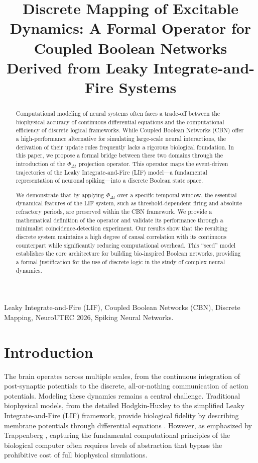 \documentclass[10pt, conference]{IEEEtran}
\title{\textbf{Discrete Mapping of Excitable Dynamics: A Formal Operator for Coupled Boolean Networks Derived from Leaky Integrate-and-Fire Systems}}
\author{
    \IEEEauthorblockN{Carlos R. P. Tovar, PhD}
    \IEEEauthorblockA{\textit{V Congreso Internacional de Neurociencias (NeuroUTEC 2026)} \\
    \textit{Universidad Tecnológica del Perú (UTP)}\\
    Lima, Perú \\
    Email: c31644@utp.edu.pe}
}
\begin{document}
\maketitle

\begin{abstract}
Computational modeling of neural systems often faces a trade-off between the biophysical accuracy of continuous differential equations and the computational efficiency of discrete logical frameworks. While Coupled Boolean Networks (CBN) offer a high-performance alternative for simulating large-scale neural interactions, the derivation of their update rules frequently lacks a rigorous biological foundation. In this paper, we propose a formal bridge between these two domains through the introduction of the $\Phi_{\Delta t}$ projection operator. This operator maps the event-driven trajectories of the Leaky Integrate-and-Fire (LIF) model—a fundamental representation of neuronal spiking—into a discrete Boolean state space. 

We demonstrate that by applying $\Phi_{\Delta t}$ over a specific temporal window, the essential dynamical features of the LIF system, such as threshold-dependent firing and absolute refractory periods, are preserved within the CBN framework. We provide a mathematical definition of the operator and validate its performance through a minimalist coincidence-detection experiment. Our results show that the resulting discrete system maintains a high degree of causal correlation with its continuous counterpart while significantly reducing computational overhead. This ``seed'' model establishes the core architecture for building bio-inspired Boolean networks, providing a formal justification for the use of discrete logic in the study of complex neural dynamics.
\end{abstract}

\begin{IEEEkeywords}
Leaky Integrate-and-Fire (LIF), Coupled Boolean Networks (CBN), Discrete Mapping, NeuroUTEC 2026, Spiking Neural Networks.
\end{IEEEkeywords}


\section{Introduction}

The brain operates across multiple scales, from the continuous integration of post-synaptic potentials to the discrete, all-or-nothing communication of action potentials. Modeling these dynamics remains a central challenge. Traditional biophysical models, from the detailed Hodgkin-Huxley \cite{hodgkin1952quantitative} to the simplified Leaky Integrate-and-Fire (LIF) framework, provide biological fidelity by describing membrane potentials through differential equations \cite{gerstner2014neuronal}. However, as emphasized by Trappenberg \cite{trappenberg2009fundamentals}, capturing the fundamental computational principles of the biological computer often requires levels of abstraction that bypass the prohibitive cost of full biophysical simulations.
\end{document}
